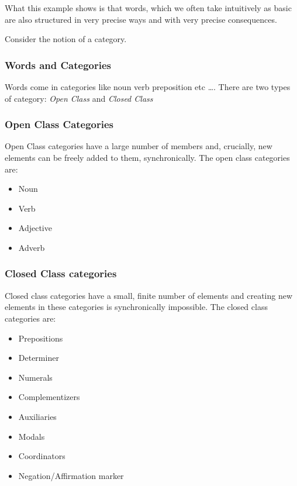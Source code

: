 \begin{frame}
What this example shows is that words, which we often take intuitively as basic are also structured in very precise ways and with very precise consequences.  

Consider the notion of a category.

\end{frame}

\begin{frame}
  \frametitle{Words and Categories}

Words come in categories like noun verb preposition etc \ldots.  There are two types of category:  \emph{Open Class} and \emph{Closed Class}  
\end{frame}

\begin{frame}
  \frametitle{Open Class Categories}

Open Class categories have a large number of members and, crucially, new elements can be freely added to them, synchronically.  The open class categories are:

\begin{itemize}
\item Noun
\item Verb
\item Adjective
\item Adverb
\end{itemize}


\end{frame}


\begin{frame}
  \frametitle{Closed Class categories}

Closed class categories have a small, finite number of elements and creating new elements in these categories is synchronically impossible.  The closed class categories are:

\begin{itemize}
\item Prepositions
\item Determiner
\item Numerals
\item Complementizers
\item Auxiliaries
\item Modals
\item Coordinators
\item Negation/Affirmation marker
\end{itemize}

\end{frame}

